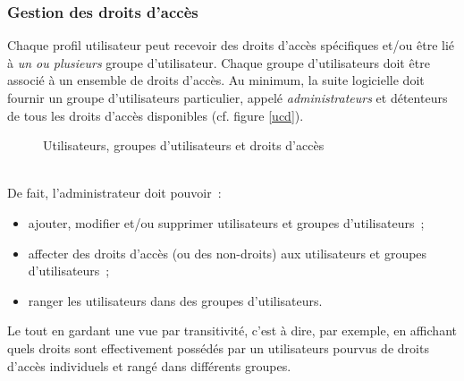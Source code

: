 \subsubsection{Gestion des droits d'accès}
Chaque profil utilisateur peut recevoir des droits d'accès spécifiques et/ou être lié à \emph{un ou plusieurs} groupe d'utilisateur.
Chaque groupe d'utilisateurs doit être associé à un ensemble de droits d'accès.
Au minimum, la suite logicielle doit fournir un groupe d'utilisateurs particulier, appelé \emph{administrateurs} et détenteurs de tous les droits d'accès disponibles (cf. figure \ref{ucd}).
\begin{figure}[htbp] %
	\centering
	\caption{Utilisateurs, groupes d'utilisateurs et droits d'accès}
	\label{ar}
\end{figure}
\\De fait, l'administrateur doit pouvoir~:
\begin{itemize}
	\item ajouter, modifier et/ou supprimer utilisateurs et groupes d'utilisateurs~;
	\item affecter des droits d'accès (ou des non-droits) aux utilisateurs et groupes d'utilisateurs~;
	\item ranger les utilisateurs dans des groupes d'utilisateurs.
\end{itemize}
Le tout en gardant une vue par transitivité, c'est à dire, par exemple, en affichant quels droits sont effectivement possédés par un utilisateurs pourvus de droits d'accès individuels et rangé dans différents groupes.

